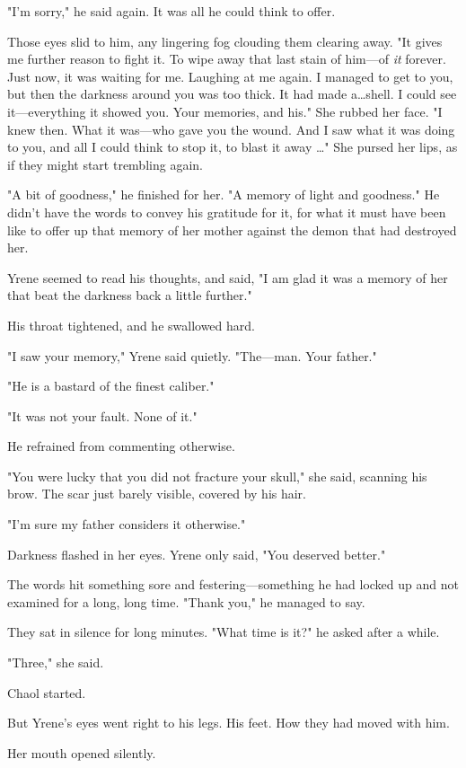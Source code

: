 "I'm sorry," he said again.
It was all he could think to offer.

Those eyes slid to him, any lingering fog clouding them clearing away.
"It gives me further reason to fight it.
To wipe away that last stain of him---of \emph{it} forever.
Just now, it was waiting for me.
Laughing at me again.
I managed to get to you, but then the darkness around you was too thick.
It had made a\ldots shell.
I could see it---everything it showed you.
Your memories, and his."
She rubbed her face.
"I knew then.
What it was---who gave you the wound.
And I saw what it was doing to you, and all I could think to stop it, to blast it away \ldots" She pursed her lips, as if they might start trembling again.

"A bit of goodness," he finished for her.
"A memory of light and goodness."
He didn't have the words to convey his gratitude for it, for what it must have been like to offer up that memory of her mother against the demon that had destroyed her.

Yrene seemed to read his thoughts, and said, "I am glad it was a memory of her that beat the darkness back a little further."

His throat tightened, and he swallowed hard.

"I saw your memory," Yrene said quietly.
"The---man.
Your father."

"He is a bastard of the finest caliber."

"It was not your fault.
None of it."

He refrained from commenting otherwise.

"You were lucky that you did not fracture your skull," she said, scanning his brow.
The scar just barely visible, covered by his hair.

"I'm sure my father considers it otherwise."

Darkness flashed in her eyes.
Yrene only said, "You deserved better."

The words hit something sore and festering---something he had locked up and not examined for a long, long time.
"Thank you," he managed to say.

They sat in silence for long minutes.
"What time is it?"
he asked after a while.

"Three," she said.

Chaol started.

But Yrene's eyes went right to his legs.
His feet.
How they had moved with him.

Her mouth opened silently.

